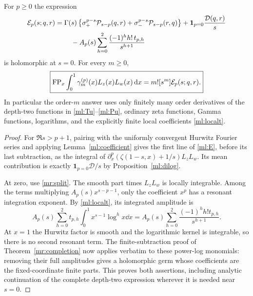 \begin{theorem}
\label{ml:allStieltjes}
For $p\ge0$ the expression
\begin{align}
 \mathcal E_p(s;q,r)={}&\Gamma(s)
       \left\{\sigma_+^{p-s}\mathcal P_{s-p}(q,r)
                  +\sigma_-^{p-s}\mathcal P_{s-p}(r,q)\right\}
        +\mathbf1_{p=0}\frac{\mathcal D(q,r)}s\notag\\
 &\quad-A_p(s)\sum_{h=0}^2\frac{(-1)^hh!\,t_{p,h}}{s^{h+1}}
       \label{ml:E}
\end{align}
is holomorphic at $s=0$. For every $m\ge0$,
\begin{equation}\label{ml:allindex}
 \boxed{\displaystyle
 \operatorname{FP}_x\int_0^1\gamma_m^{(p)}(x)L_z(x)L_w(x)\,\mathrm d x
                      =m![s^m]\mathcal E_p(s;q,r).}
\end{equation}
In particular the order-$m$ answer uses only finitely many order
derivatives of the depth-two functions in \eqref{ml:Tu}--\eqref{ml:Pu},
ordinary zeta functions, Gamma functions, logarithms, and the explicitly
finite local coefficients \eqref{ml:localt}.
\end{theorem}

\begin{proof}
For $\Re s>p+1$, pairing with the uniformly convergent Hurwitz Fourier
series and applying Lemma~\ref{ml:coefficient} gives the first line of
\eqref{ml:E}, before its last subtraction, as the integral of
$\partial_x^p(\zeta(1-s,x)+1/s)L_zL_w$. Its mean contribution is
exactly $\mathbf1_{p=0}\mathcal D/s$ by Proposition~\ref{ml:dilog}.

At zero, use \eqref{mr:split}. The smooth part times $L_zL_w$ is
locally integrable. Among the terms multiplying $A_p(s)x^{s-p-1}$,
only the coefficient $x^p$ has a resonant integration exponent.
By \eqref{ml:localt}, its integrated amplitude is
\[
 A_p(s)\sum_{h=0}^2t_{p,h}
                 \int_0^1x^{s-1}\log^hx\dd x
     =A_p(s)\sum_{h=0}^2\frac{(-1)^hh!t_{p,h}}{s^{h+1}}.
\]
At $x=1$ the Hurwitz factor is smooth and the logarithmic kernel is
integrable, so there is no second resonant term. The finite-subtraction
proof of Theorem~\ref{mr:completion} now applies verbatim to these
power-log monomials: removing their full amplitudes gives a holomorphic
germ whose coefficients are the fixed-coordinate finite parts.
This proves both assertions, including analytic continuation of the
complete depth-two expression wherever it is needed near $s=0$.
\end{proof}

